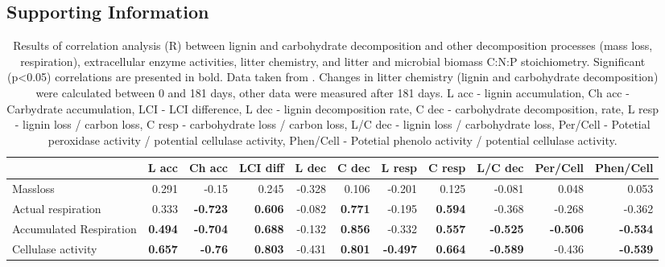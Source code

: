 \documentclass[10pt]{article}
\begin{document}
\begin{flushleft}
\newpage


\section*{Supporting Information}

\newpage




\begin{landscape}

\begin{table}[h!]
\begin{center}
\caption{Results of correlation analysis (R) between lignin and carbohydrate decomposition and other decomposition processes (mass loss, respiration), extracellular enzyme activities, litter chemistry, and litter and microbial biomass C:N:P stoichiometry. Significant (p\textless 0.05) correlations are presented in bold. Data taken from \cite{Mooshammer2011, Leitner2011}. Changes in litter chemistry (lignin and carbohydrate decomposition) were calculated between 0 and 181 days, other data were measured after 181 days. L acc - lignin accumulation, Ch acc - Carbydrate accumulation, LCI - LCI difference, L dec - lignin decomposition rate, C dec - carbohydrate decomposition,  rate, L resp - lignin loss / carbon loss, C resp - carbohydrate loss / carbon loss, L/C dec - lignin loss / carbohydrate loss, Per/Cell - Potetial peroxidase activity / potential cellulase activity, Phen/Cell - Potetial phenolo activity / potential cellulase activity.}
\label{corrtable}
{\small
\begin{tabular}{lrrrrrrrrrr}
  \hline
 & L acc & Ch acc & LCI diff & L dec & C dec & L resp & C resp & L/C dec & Per/Cell & Phen/Cell \\ 
  \hline
Massloss & 0.291 & -0.15 & 0.245 & -0.328 & 0.106 & -0.201 & 0.125 & -0.081 & 0.048 & 0.053 \\ 
  Actual respiration & 0.333 & \textbf{-0.723} & \textbf{0.606} & -0.082 & \textbf{0.771} & -0.195 & \textbf{0.594} & -0.368 & -0.268 & -0.362 \\ 
  Accumulated Respiration & \textbf{0.494} & \textbf{-0.704} & \textbf{0.688} & -0.132 & \textbf{0.856} & -0.332 & \textbf{0.557} & \textbf{-0.525} & \textbf{-0.506} & \textbf{-0.534} \\ 
  Cellulase activity & \textbf{0.657} & \textbf{-0.76} & \textbf{0.803} & -0.431 & \textbf{0.801} & \textbf{-0.497} & \textbf{0.664} & \textbf{-0.589} & -0.436 & \textbf{-0.539} \\ 

\end{tabular}}
\end{center}
\end{table}
\end{landscape}
\end{flushleft}
\end{document}

